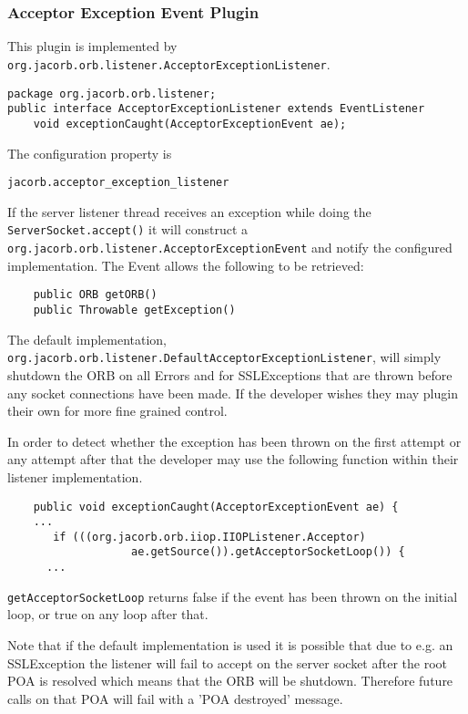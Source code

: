 {{\subsubsection{Acceptor Exception Event Plugin}
\label{acceptorevent}
This plugin is implemented by {\tt
org.jacorb.orb.listener.AcceptorExceptionListener}.
\begin{small}
\begin{verbatim}
package org.jacorb.orb.listener;
public interface AcceptorExceptionListener extends EventListener
    void exceptionCaught(AcceptorExceptionEvent ae);
\end{verbatim}
\end{small}
The configuration property is
\begin{verbatim}
jacorb.acceptor_exception_listener
\end{verbatim}
If the server listener thread receives an exception while doing the {\tt
ServerSocket.accept()} it will construct a {\tt
org.jacorb.orb.listener.AcceptorExceptionEvent} and notify the configured
implementation. The Event allows the following to be retrieved:
\begin{small}
\begin{verbatim}
    public ORB getORB()
    public Throwable getException()
\end{verbatim}
\end{small}
The default implementation, {\tt
org.jacorb.orb.listener.DefaultAcceptor\-ExceptionListener}, will simply shutdown
the ORB on all Errors and for SSLExceptions that are thrown before any socket
connections have been made. If the developer wishes they may plugin
their own for more fine grained control.

In order to detect whether the exception has been thrown on the first attempt
or any attempt after that the developer may use the following function within
their listener implementation.
\begin{small}
\begin{verbatim}
    public void exceptionCaught(AcceptorExceptionEvent ae) {
    ...
       if (((org.jacorb.orb.iiop.IIOPListener.Acceptor)
                   ae.getSource()).getAcceptorSocketLoop()) {
      ...
\end{verbatim}
\end{small}
{\tt getAcceptorSocketLoop} returns false if the event has been thrown on the
initial loop, or true on any loop after that.

Note that if the default implementation is used it is possible that due to e.g.
an SSLException the listener will fail to accept on the server socket after the
root POA is resolved which means that the ORB will be shutdown. Therefore future
calls on that POA will fail with a 'POA destroyed' message.

}}
